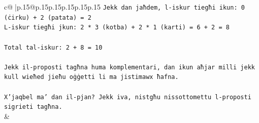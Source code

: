 \documentclass{article}
\begin{document}
{\begin{supertabular}{c@{$\;$}|p{.15\linewidth}@{}p{.15\linewidth}p{.15\linewidth}p{.15\linewidth}p{.15\linewidth}p{.15\linewidth}}
{{{\texttt{Jekk dan jaħdem, l{-}iskur tiegħi ikun: 0 (ċirku) + 2 (patata) = 2} \\
\texttt{L{-}iskur tiegħi jkun: 2 * 3 (kotba) + 2 * 1 (karti) = 6 + 2 = 8} \\
\\ 
\texttt{Total tal{-}iskur: 2 + 8 = 10} \\
\\ 
\texttt{Jekk il{-}proposti tagħna huma komplementari, dan ikun aħjar milli jekk kull wieħed jieħu oġġetti li ma jistimawx ħafna.} \\
\\ 
\texttt{X'jaqbel ma' dan il{-}pjan? Jekk iva, nistgħu nissottomettu l{-}proposti sigrieti tagħna.} \\
            }
        }
    }
    & \\ \\


\end{supertabular}}
\end{document}
